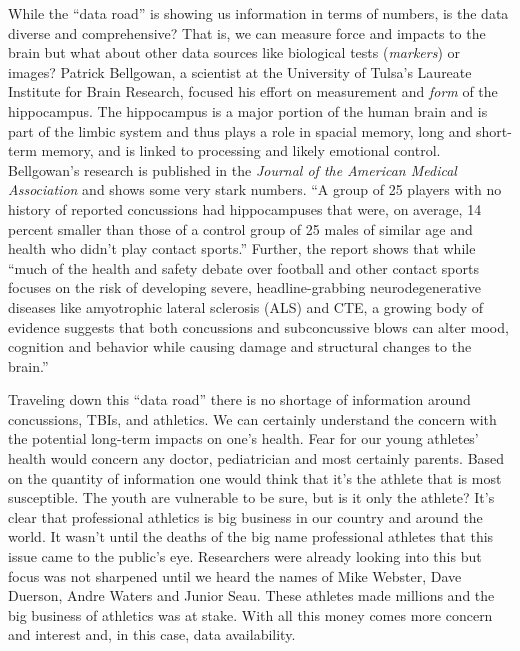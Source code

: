 \documentclass[sigconf]{acmart}
\begin{document}
While the ``data road'' is showing us information in terms of numbers, is the data diverse and comprehensive?  That is, we can measure force and impacts to the brain but what about other data sources like biological tests ({\em markers}) or images?  Patrick Bellgowan, a scientist at the University of Tulsa's Laureate Institute for Brain Research, focused his effort on measurement and {\em form} of the hippocampus.  The hippocampus is a major portion of the human brain and is part of the limbic system and thus plays a role in spacial memory, long and short-term memory, and is linked to processing and likely emotional control.  Bellgowan's research is published in the {\em Journal of the American Medical Association} and shows some very stark numbers. ``A group of 25 players with no history of reported concussions had hippocampuses that were, on average, 14 percent smaller than those of a control group of 25 males of similar age and health who didn't play contact sports.'' \cite{www-sportsonearth-com}  Further, the report shows that while ``much of the health and safety debate over football and other contact sports focuses on the risk of developing severe, headline-grabbing neurodegenerative diseases like amyotrophic lateral sclerosis (ALS) and CTE, a growing body of evidence suggests that both concussions and subconcussive blows can alter mood, cognition and behavior while causing damage and structural changes to the brain.'' \cite{www-sportsonearth-com}

Traveling down this ``data road'' there is no shortage of information around concussions, TBIs, and athletics.  We can certainly understand the concern with the potential long-term impacts on one's health.  Fear for our young athletes' health would concern any doctor, pediatrician and most certainly parents.  Based on the quantity of information one would think that it's the athlete that is most susceptible.  The youth are vulnerable to be sure, but is it only the athlete?  It's clear that professional athletics is big business in our country and around the world.  It wasn't until the deaths of the big name professional athletes that this issue came to the public's eye.  Researchers were already looking into this but focus was not sharpened until we heard the names of Mike Webster, Dave Duerson, Andre Waters and Junior Seau.  These athletes made millions and the big business of athletics was at stake.  With all this money comes more concern and interest and, in this case, data availability. 
\end{document}
